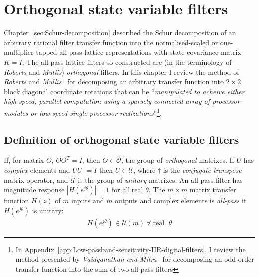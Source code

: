 \documentclass[a4paper,twoside,10pt,english]{report}
\begin{document}
\chapter{Orthogonal state variable filters\label{sec:Orthogonal-state-variable-filters}}
Chapter~\ref{sec:Schur-decomposition} described the Schur decomposition of 
an arbitrary rational filter transfer function into the normalised-scaled
or one-multiplier tapped all-pass lattice representations with state covariance
matrix $K=I$. The all-pass lattice filters so constructed are (in the 
terminology of \emph{Roberts} and \emph{Mullis}) \emph{orthogonal} filters. 
In this chapter I review the method of \emph{Roberts} and 
\emph{Mullis}~\cite[Section 10.4]{RobertsMullis_DigitalSignalProcessing} for 
decomposing an arbitrary transfer function into $2\times{}2$ block diagonal 
coordinate rotations that can be ``\emph{manipulated to acheive either
high-speed, parallel computation using a sparsely connected array of processor
modules or low-speed single processor realizations}''\footnote{In 
Appendix~\ref{app:Low-passband-sensitivity-IIR-digital-filters}, I review the 
method presented by
\emph{Vaidyanathan and Mitra}~\cite{VaidyanathanMitraNuevo_LowSensitivityIIRDigitalFilters, VaidyanathanMitra_LowPassbandSensitivityDigitalFilters} 
for decomposing an odd-order transfer function into the sum of two all-pass 
filters}.

\section{Definition of orthogonal state variable filters}
If, for matrix $O$, $OO^T=I$, then $O \in \mathcal{O}$, the group of
\emph{orthogonal} matrixes. If $U$ has \emph{complex} elements and
$UU^{\dagger}=I$ then $U \in \mathcal{U}$, where $\dagger$ is the 
\emph{conjugate transpose} matrix operator, and $\mathcal{U}$ is the group of 
\emph{unitary} matrixes. An all pass filter has magnitude response 
$\left|H\left(e^{j\theta}\right)\right|=1$ for all real $\theta$. The 
$m \times m$ matrix transfer function $H\left(z\right)$ of $m$ inputs and 
$m$ outputs and complex elements is \emph{all-pass} if 
$H\left(e^{j\theta}\right)$ is unitary:
\begin{align*}
H\left(e^{j\theta}\right)\in\mathcal{U}\left(m\right) 
~ \forall\; \text{real } \; \theta
\end{align*}
\end{document}
